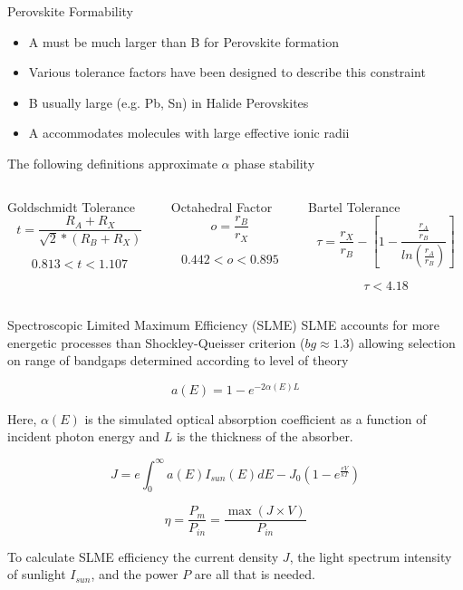 \documentclass[10pt, aspectratio=169, presentation]{beamer}
\begin{document}
\begin{frame}[label={sec:org88fcc44}]{Perovskite Formability}
\begin{itemize}
\item A must be much larger than B for Perovskite formation
\item Various tolerance factors have been designed to describe this constraint
\item B usually large (e.g. Pb, Sn) in Halide Perovskites
\item A accommodates \alert{molecules} with large effective ionic radii\autocite{kieslich-2015-exten-toler}
\end{itemize}

The following definitions approximate \(\alpha\) phase stability
\autocite{yin-2015-halid-perov,bartel-2019-new-toler}
\begin{columns}
\begin{column}{0.33\columnwidth}
\begin{block}{Goldschmidt Tolerance}
\[
t = \frac{R_A+R_X}{\sqrt{2}*(R_B+R_X)}
\]

\[
0.813 < t < 1.107
\]
\end{block}
\end{column}

\begin{column}{0.33\columnwidth}
\begin{block}{Octahedral Factor}
\[
o=\frac{r_B}{r_X}
\]

\[
0.442 < o < 0.895
\]
\end{block}
\end{column}

\begin{column}{0.33\columnwidth}
\begin{block}{Bartel Tolerance}
\[
\tau = \frac{r_X}{r_B}-\left[ 1-\frac{\frac{r_A}{r_B}}{ln(\frac{r_A}{r_B})} \right]
\]

\[
\tau < 4.18
\]
\end{block}
\end{column}
\end{columns}
\end{frame}

\begin{frame}[label={sec:orgb696d80}]{Spectroscopic Limited Maximum Efficiency (SLME)}
SLME accounts for more energetic processes than Shockley-Queisser
criterion (\(bg \approx 1.3\)) allowing selection on range of bandgaps
determined according to level of theory\autocite[p.1]{yu-2012-ident-poten}

\[
a(E)=1-e^{-2\alpha(E)L}
\]

Here, \(\alpha(E)\) is the simulated optical absorption coefficient
as a function of incident photon energy and \(L\) is the thickness of
the absorber.

\[
J=e\int_{0}^{\infty} a(E)I_{sun}(E)dE - J_{0}(1-e^{\frac{eV}{kT}})
\]

\[
\eta = \frac{P_{m}}{P_{in}}=\frac{\max(J \times V)}{P_{in}}
\]

To calculate SLME efficiency the current density \(J\), the light
spectrum intensity of sunlight \(I_{sun}\), and the power \(P\) are
all that is needed.
\end{frame}
\end{document}
